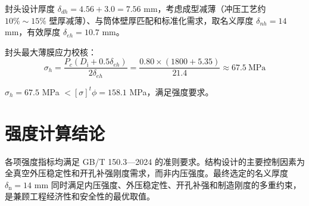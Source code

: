 封头设计厚度 $\delta_{dh} = 4.56 + 3.0 = 7.56$ mm，考虑成型减薄（冲压工艺约 $10\% \sim 15\%$ 壁厚减薄）、与筒体壁厚匹配和标准化需求，取名义厚度 $\delta_{nh} = 14$ mm，有效厚度 $\delta_{eh} = 10.7$ mm。

封头最大薄膜应力校核：
\[
\sigma_h = \frac{P_c (D_{\mathrm{i}} + 0.5\delta_{eh})}{2\delta_{eh}}
         = \frac{0.80 \times (1800 + 5.35)}{21.4}
         \approx 67.5\ \text{MPa}
\]

$\sigma_h = 67.5$ MPa $ < [\sigma]^t \phi = 158.1$ MPa，满足强度要求。


\section{强度计算结论}

各项强度指标均满足 GB/T 150.3—2024 的准则要求。结构设计的主要控制因素为全真空外压稳定性和开孔补强刚度需求，而非内压强度。最终选定的名义厚度 $\delta_{\mathrm{n}} = 14$ mm 同时满足内压强度、外压稳定性、开孔补强和制造刚度的多重约束，是兼顾工程经济性和安全性的最优取值。

